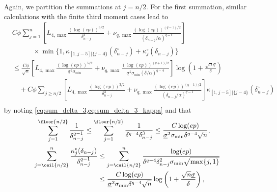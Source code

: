 \documentclass[aos]{imsart}
\begin{document}
\begin{appendix}
\medskip
{} 
Again, we partition the summations at $j = n/2$. For the first summation, similar calculations with the finite third moment cases lead to
\begin{equation*}
\begin{aligned}
    & C \phi \sum_{j=1}^n \left[ 
        {L}_{4,\max} \frac{(\log(ep))^{3/2}}{\delta_{n-j}^3}
        + \nu_{q,\max} \frac{{(\log(ep))}^{(q-1)/2}}{(\delta_{n-j}/\alpha)^{q-1}}
    \right] \\
    & \qquad \quad \times \min\{1, \kappa_{[1,j-5]|\{j-4\}}(\delta_{n-j}^\circ) + \kappa^\circ_{j}(\delta_{n-j})\} \\
    & \leq \frac{C \phi}{\sqrt{n}} \left[
        {L}_{4,\max} \frac{(\log(ep))^{5/2}}{\underline{\sigma}^2\sigma_{\min}} 
        + {\nu}_{q,\max} \frac{{(\log(ep))}^{(q+1)/2}}{\underline{\sigma}^{2}\sigma_{\min} (\delta/\alpha)^{q-4}} 
    \right] 
    \log\left(1 + \frac{\sqrt{n}\underline{\sigma}}{\delta}\right) \\
    & \quad + C \phi \sum_{j \geq n/2} \left[ 
        {L}_{4,\max} \frac{(\log(ep))^{3/2}}{\delta_{n-j}^3}
        + \nu_{q,\max} \frac{{(\log(ep))}^{(q-1)/2}}{(\delta_{n-j}/\alpha)^{q-1}}
    \right]
    \kappa_{[1,j-5]|\{j-4\}}(\delta_{n-j}^\circ) \\
\end{aligned}
\end{equation*}
by noting \cref{eq:sum_delta_3,eq:sum_delta_3_kappa} and that
\begin{equation}\label{eq:sum_delta_q}
\begin{aligned}
    \sum_{j=1}^{\floor{n/2}} \frac{1}{\delta_{n-j}^{q-1}} 
    & \leq \sum_{j=1}^{\floor{n/2}} \frac{1}{\delta^{q-4} \delta_{n-j}^{3}} 
    \leq \frac{C \log(ep)}{\underline{\sigma}^{2}\sigma_{\min} \delta^{q-4} \sqrt{n}},
\end{aligned}         
\end{equation}
\begin{equation} \label{eq:sum_delta_q_kappa}
\begin{aligned}
    \sum_{j=\ceil{n/2}}^{n} \frac{\kappa^\circ_{j}(\delta_{n-j})}{\delta_{n-j}^{q-1}}
    & \leq \sum_{j=\ceil{n/2}}^{n} \frac{\log(ep)}{\delta^{q-4} \delta_{n-j}^{2} \sigma_{\min} \sqrt{\max\{j,1\}}} \\
    & \leq \frac{C\log(ep)}{\underline{\sigma}^{2}\sigma_{\min} \delta^{q-4} \sqrt{n}} \log\left(1 + \frac{\sqrt{n}\underline{\sigma}}{\delta}\right),

\end{aligned}
\end{equation}
\end{appendix}
\end{document}
